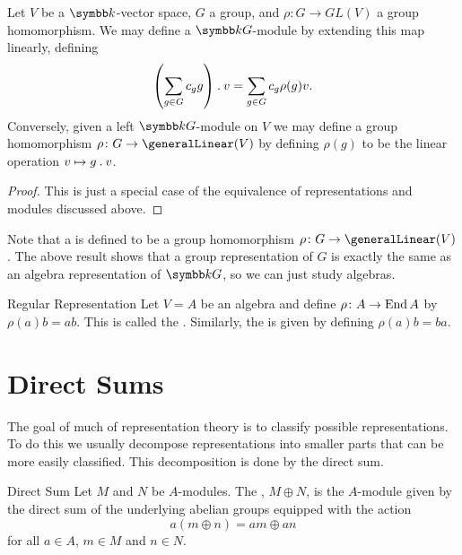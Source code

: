 \begin{prp}{}{}
    Let \(V\) be a \(\field\)-vector space, \(G\) a group, and \(\rho \colon G \to GL(V)\) a group homomorphism.
    We may define a \(\field G\)-module by extending this map linearly, defining
    \begin{equation}
        \left( \sum_{g \in G} c_g g \right) \mathbin{.} v = \sum_{g \in G} c_g \rho(g)v.
    \end{equation}
    Conversely, given a left \(\field G\)-module on \(V\) we may define a group homomorphism \(\rho \colon G \to \generalLinear(V)\) by defining \(\rho(g)\) to be the linear operation \(v \mapsto g \mathbin{.} v\).
    \begin{proof}
        This is just a special case of the equivalence of representations and modules discussed above.
    \end{proof}
\end{prp}

Note that a  is defined to be a group homomorphism \(\rho \colon G \to \generalLinear(V)\).
The above result shows that a group representation of \(G\) is exactly the same as an algebra representation of \(\field G\), so we can just study algebras.

\begin{dfn}{Regular Representation}{}
    Let \(V = A\) be an algebra and define \(\rho \colon A \to \operatorname{End} A\) by \(\rho(a)b = ab\).
    This is called the .
    Similarly, the  is given by defining \(\rho(a)b = ba\).
\end{dfn}

\section{Direct Sums}
The goal of much of representation theory is to classify possible representations.
To do this we usually decompose representations into smaller parts that can be more easily classified.
This decomposition is done by the direct sum.

\begin{dfn}{Direct Sum}{}
    Let \(M\) and \(N\) be \(A\)-modules.
    The , \(M \oplus N\), is the \(A\)-module given by the direct sum of the underlying abelian groups equipped with the action
    \begin{equation}
        a(m \oplus n) = am \oplus an
    \end{equation}
    for all \(a \in A\), \(m \in M\) and \(n \in N\).
\end{dfn}

